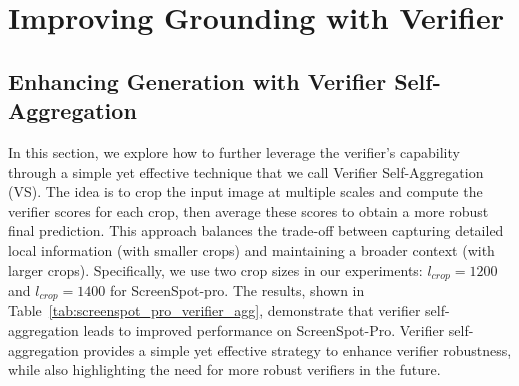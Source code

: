 \documentclass{article}
\begin{document}
\section{Improving Grounding with Verifier}\label{app:additional_exp_grounding}

\subsection{Enhancing Generation with Verifier Self-Aggregation}
\label{app:verifier_agg}
In this section, we explore how to further leverage the verifier's capability through a simple yet effective technique that we call Verifier Self-Aggregation (VS). The idea is to crop the input image at multiple scales and compute the verifier scores for each crop, then average these scores to obtain a more robust final prediction. This approach balances the trade-off between capturing detailed local information (with smaller crops) and maintaining a broader context (with larger crops). Specifically, we use two crop sizes in our experiments: $l_{crop}=1200$ and $l_{crop}=1400$ for ScreenSpot-pro. The results, shown in Table~\ref{tab:screenspot_pro_verifier_agg}, demonstrate that verifier self-aggregation leads to improved performance on ScreenSpot-Pro. Verifier self-aggregation provides a simple yet effective strategy to enhance verifier robustness, while also highlighting the need for more robust verifiers in the future.




\end{document}
